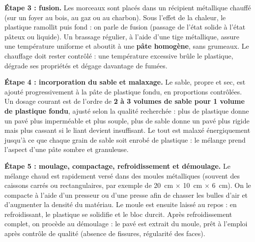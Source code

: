 \documentclass[11pt]{article}
\newcommand{\cle}[1]{{\popxbold\color{popdark}#1}}
\begin{document}
\textbf{Étape 3 : fusion.} Les morceaux sont placés dans un récipient métallique chauffé (sur un foyer au bois, au gaz ou au charbon). Sous l'effet de la chaleur, le plastique ramollit puis fond : on parle de \cle{fusion} (passage de l'état solide à l'état pâteux ou liquide). Un brassage régulier, à l'aide d'une tige métallique, assure une température uniforme et aboutit à une \textbf{pâte homogène}, sans grumeaux. Le chauffage doit rester contrôlé : une température excessive brûle le plastique, dégrade ses propriétés et dégage davantage de fumées.

\textbf{Étape 4 : incorporation du sable et malaxage.} Le sable, propre et sec, est ajouté progressivement à la pâte de plastique fondu, en proportions contrôlées. Un dosage courant est de l'ordre de \textbf{2 à 3 volumes de sable pour 1 volume de plastique fondu}, ajusté selon la qualité recherchée : plus de plastique donne un pavé plus imperméable et plus souple, plus de sable donne un pavé plus rigide mais plus cassant si le liant devient insuffisant. Le tout est malaxé énergiquement jusqu'à ce que chaque grain de sable soit enrobé de plastique : le mélange prend l'aspect d'une pâte sombre et granuleuse.

\textbf{Étape 5 : moulage, compactage, refroidissement et démoulage.} Le mélange chaud est rapidement versé dans des \cle{moules} métalliques (souvent des caissons carrés ou rectangulaires, par exemple de \SI{20}{cm} $\times$ \SI{10}{cm} $\times$ \SI{6}{cm}). On le compacte à l'aide d'un presseur ou d'une presse afin de chasser les bulles d'air et d'augmenter la densité du matériau. Le moule est ensuite laissé au repos : en refroidissant, le plastique se solidifie et le bloc durcit. Après refroidissement complet, on procède au \cle{démoulage} : le pavé est extrait du moule, prêt à l'emploi après contrôle de qualité (absence de fissures, régularité des faces).
\end{document}
